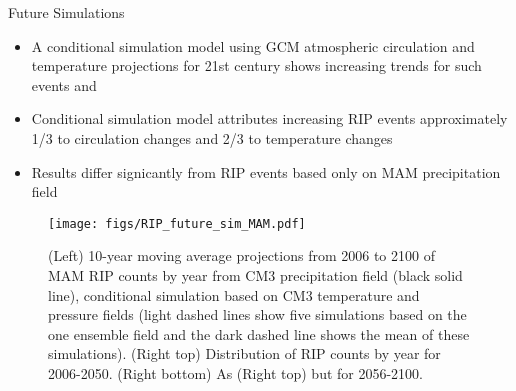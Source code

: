 \begin{block}{Future Simulations}
  \begin{itemize}
    \item A conditional simulation model using GCM atmospheric circulation and temperature projections for 21st century shows increasing trends for such events and
    \item Conditional simulation model attributes increasing RIP events approximately 1/3 to circulation changes and 2/3 to temperature changes
    \item Results differ signicantly from RIP events based only on MAM precipitation field
  \end{itemize}
  \begin{figure}[ht!]
    \centerline{\texttt{[image: figs/RIP\_future\_sim\_MAM.pdf]}}
    \caption{
      (Left) 10-year moving average projections from 2006 to 2100 of MAM RIP counts by year from CM3 precipitation field (black solid line), conditional simulation based on CM3 temperature and pressure fields (light dashed lines show five simulations based on the one ensemble field and the dark dashed line shows the mean of these simulations).
      (Right top) Distribution of RIP counts by year for 2006-2050.
      (Right bottom) As (Right top) but for 2056-2100.
      }
      \label{fig:future-simulations}
  \end{figure}
\end{block}
